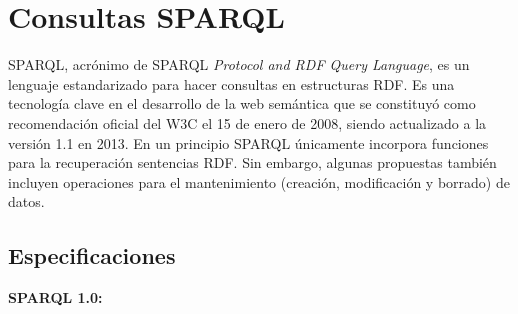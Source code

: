 \documentclass[conference]{IEEEtran}
\begin{document}
\section{Consultas SPARQL}


SPARQL, acrónimo de SPARQL \textit{Protocol and RDF Query Language}, es un lenguaje estandarizado para hacer consultas en estructuras RDF.  Es una tecnología clave en el desarrollo de la web semántica que se constituyó como recomendación oficial del W3C el 15 de enero de 2008, siendo actualizado a la versión 1.1 en 2013\cite{b1}. En un principio SPARQL únicamente incorpora funciones para la recuperación sentencias RDF. Sin embargo, algunas propuestas también incluyen operaciones para el mantenimiento (creación, modificación y borrado) de datos.

\subsection{Especificaciones}

\textbf{SPARQL 1.0:}
\end{document}
